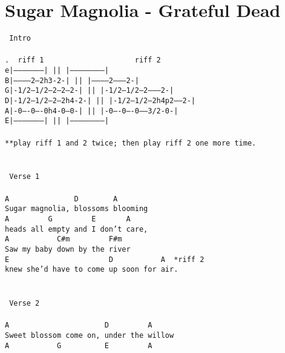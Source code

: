 \newpage
\section{Sugar Magnolia - Grateful Dead}
\label{Sugar Magnolia - Grateful Dead}
\texttt{\lbrack\ Intro\rbrack\\
\\
. \ riff\ 1\ \ \ \ \ \ \ \ \ \ \ \ \ \ \ \ \ \ \ \ \ riff\ 2\\
e|---------------------|\ ||\ |-----------------------|\\
B|-----------2---2h3-2-|\ ||\ |-----------2---------2-|\\
G|-1/2--1/2--2---2---2-|\ ||\ |-1/2--1/2--2---------2-|\\
D|-1/2--1/2--2---2h4-2-|\ ||\ |-1/2--1/2--2h4p2-----2-|\\
A|-0----0----0h4-0---0-|\ ||\ |-0----0----0-----3/2-0-|\\
E|---------------------|\ ||\ |-----------------------|\\
\\
**play\ riff\ 1\ and\ 2\ twice;\ then\ play\ riff\ 2\ one\ more\ time.\\
\\
\\
\lbrack\ Verse\ 1\rbrack\\
\\
A\ \ \ \ \ \ \ \ \ \ \ \ \ \ \ D\ \ \ \ \ \ \ \ A\\
Sugar\ magnolia,\ blossoms\ blooming\\
A\ \ \ \ \ \ \ \ \ G\ \ \ \ \ \ \ \ \ E\ \ \ \ \ \ \ A\\
heads\ all\ empty\ and\ I\ don't\ care,\\
A\ \ \ \ \ \ \ \ \ \ \ C\#m\ \ \ \ \ \ \ \ \ F\#m\\
Saw\ my\ baby\ down\ by\ the\ river\\
E\ \ \ \ \ \ \ \ \ \ \ \ \ \ \ \ \ \ \ \ \ \ \ D\ \ \ \ \ \ \ \ \ \ \ A\ \ *riff\ 2\ \ \ \ \ \\
knew\ she'd\ have\ to\ come\ up\ soon\ for\ air.\\
\\
\\
\lbrack\ Verse\ 2\rbrack\\
\\
A\ \ \ \ \ \ \ \ \ \ \ \ \ \ \ \ \ \ \ \ \ \ D\ \ \ \ \ \ \ \ \ A\\
Sweet\ blossom\ come\ on,\ under\ the\ willow\\
A\ \ \ \ \ \ \ \ \ \ \ G\ \ \ \ \ \ \ \ \ \ E\ \ \ \ \ \ \ \ \ A\\
}
